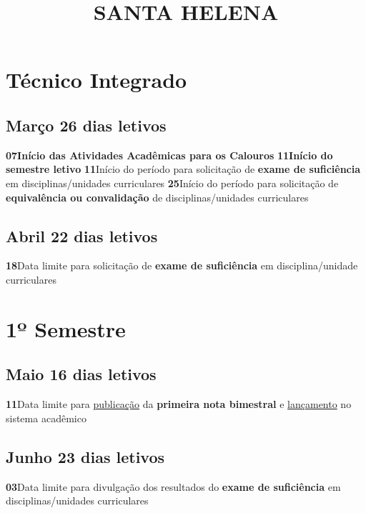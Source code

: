 \documentclass[thesis]{hmcposter}
\author{ }
\title{SANTA HELENA}
\begin{document}
\begin{poster}
\normalsize
				\section{\color{hmcorange}Técnico Integrado}\subsection{Março \hfill 26 dias letivos}\textbf{07}\qquad \textbf{Início das Atividades Acadêmicas para os Calouros} \newline \null\textbf{11}\qquad \textbf{Início do semestre letivo} \newline \null\textbf{11}\qquad Início do período para solicitação de \textbf{exame de suficiência} em disciplinas/unidades curriculares \newline \null\textbf{25}\qquad Início do período para solicitação de \textbf{equivalência ou convalidação} de disciplinas/unidades curriculares \newline \null\subsection{Abril \hfill 22 dias letivos}\textbf{18}\qquad Data limite para solicitação de \textbf{exame de suficiência} em disciplina/unidade curriculares \newline \null\vfill\null
\columnbreak
\section{\hfill \color{hmcorange}1º Semestre}
\subsection{Maio \hfill 16 dias letivos}\textbf{11}\qquad Data limite para \underline{publicação} da \textbf{primeira nota bimestral} e \underline{lançamento} no sistema acadêmico \newline \null\subsection{Junho \hfill 23 dias letivos}\textbf{03}\qquad Data limite para divulgação dos resultados do \textbf{exame de suficiência} em disciplinas/unidades curriculares \newline \null\newpage

\end{poster}
\end{document}
